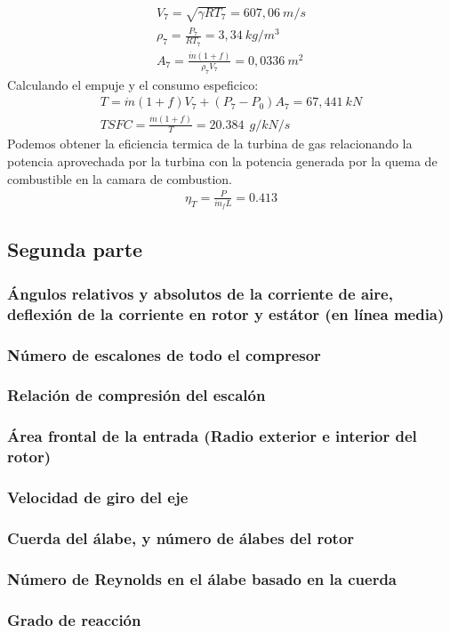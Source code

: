 \documentclass{report}
\begin{document}
\begin{gather}
  V_7 = \sqrt{\gamma R T_7}=607,06\:m/s\\
  \rho_7 = \frac{P_7}{R T_7}=3,34\:kg/m^3\\
  A_7 = \frac{\Dot{m} (1+f)}{\rho_7 V_7}=0,0336\:m^2
\end{gather}
Calculando el empuje y el consumo espeficico:
\begin{gather}
  T = \Dot{m} (1+f) V_7 + (P_7-P_0)A_7=67,441\:kN\\
  TSFC = \frac{\Dot{m} (1+f)}{T}=\boxed{20.384\:\ g/kN/s}
\end{gather}
Podemos obtener la eficiencia termica de la turbina de gas relacionando la potencia aprovechada por la turbina con la potencia generada por la quema de combustible en la camara de combustion.
\begin{gather}
  \eta_T = \frac{P}{\Dot{m}_f L}=\boxed{0.413}
\end{gather}
\newpage
\subsection{Segunda parte}
\subsubsection{Ángulos relativos y absolutos de la corriente de aire, deflexión de la corriente en rotor y estátor (en línea media)}
\subsubsection{Número de escalones de todo el compresor}
\subsubsection{Relación de compresión del escalón}
\subsubsection{Área frontal de la entrada (Radio exterior e interior del rotor)}
\subsubsection{Velocidad de giro del eje}
\subsubsection{Cuerda del álabe, y número de álabes del rotor}
\subsubsection{Número de Reynolds en el álabe basado en la cuerda}
\subsubsection{Grado de reacción}
\end{document}
